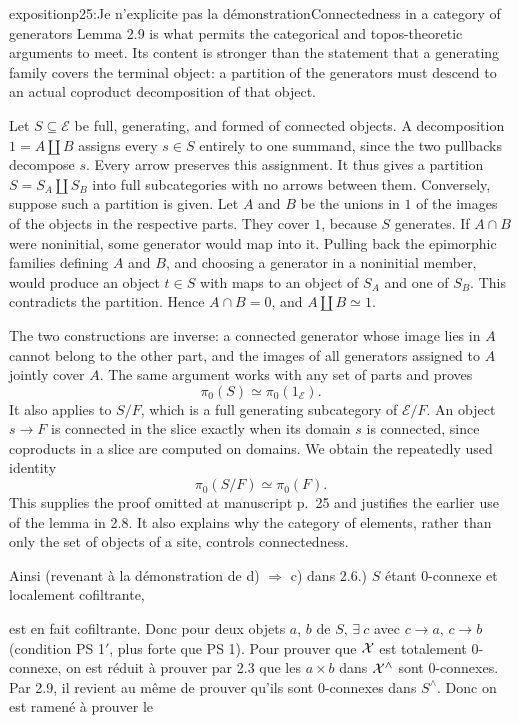\begin{dcomment}{exposition}{p25:Je n'explicite pas la démonstration}{Connectedness in a category of generators}
Lemma 2.9 is what permits the categorical and topos-theoretic arguments to meet. Its content is stronger than the statement that a generating family covers the terminal object: a partition of the generators must descend to an actual coproduct decomposition of that object.

Let $S\subseteq\mathcal E$ be full, generating, and formed of connected objects. A decomposition $1=A\amalg B$ assigns every $s\in S$ entirely to one summand, since the two pullbacks decompose $s$. Every arrow preserves this assignment. It thus gives a partition $S=S_A\amalg S_B$ into full subcategories with no arrows between them. Conversely, suppose such a partition is given. Let $A$ and $B$ be the unions in $1$ of the images of the objects in the respective parts. They cover $1$, because $S$ generates. If $A\cap B$ were noninitial, some generator would map into it. Pulling back the epimorphic families defining $A$ and $B$, and choosing a generator in a noninitial member, would produce an object $t\in S$ with maps to an object of $S_A$ and one of $S_B$. This contradicts the partition. Hence $A\cap B=0$, and $A\amalg B\simeq1$.

The two constructions are inverse: a connected generator whose image lies in $A$ cannot belong to the other part, and the images of all generators assigned to $A$ jointly cover $A$. The same argument works with any set of parts and proves
\[
 \pi _0(S)\simeq\pi _0(1_{\mathcal E}).
\]
It also applies to $S/F$, which is a full generating subcategory of $\mathcal E/F$. An object $s\to F$ is connected in the slice exactly when its domain $s$ is connected, since coproducts in a slice are computed on domains. We obtain the repeatedly used identity
\[
 \pi _0(S/F)\simeq\pi _0(F).
\]
This supplies the proof omitted at manuscript p.~25 and justifies the earlier use of the lemma in 2.8. It also explains why the category of elements, rather than only the set of objects of a site, controls connectedness.
\end{dcomment}


Ainsi (revenant à la démonstration de d) $\Longrightarrow$ c) dans 2.6.) $S$ étant 0-connexe et localement cofiltrante,

 est en fait cofiltrante. Donc pour deux objets $a$, $b$ de $S$, $\exists\ c$ avec $c\longrightarrow a$, $c\longrightarrow b$ (condition PS 1$'$, plus forte que PS 1). Pour prouver que $\mathcal{X}$ est totalement 0-connexe, on est réduit à prouver par 2.3 que les $a\times b$ dans $\mathcal{X}^\wedge$ sont 0-connexes. Par 2.9, il revient au même de prouver qu'ils sont 0-connexes dans $S^\wedge$. Donc on est ramené à prouver le

